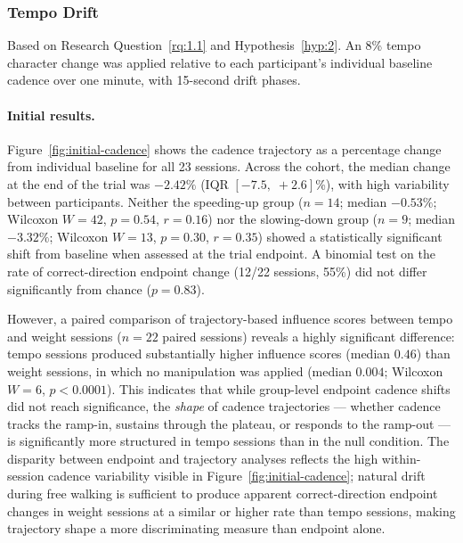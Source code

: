 
\subsubsection{Tempo Drift}
\label{sec:results-tempo}

Based on Research Question~\ref{rq:1.1} and Hypothesis~\ref{hyp:2}.
An 8\% tempo character change was applied relative to each participant's
individual baseline cadence over one minute, with 15-second drift phases.

\paragraph{Initial results.}

Figure~\ref{fig:initial-cadence} shows the cadence trajectory as a percentage
change from individual baseline for all 23 sessions.
Across the cohort, the median change at the end of the trial was $-2.42\%$
(IQR $[-7.5,\; +2.6]$\%), with high variability between participants.
Neither the speeding-up group ($n = 14$; median $-0.53\%$;
Wilcoxon $W = 42$, $p = 0.54$, $r = 0.16$)
nor the slowing-down group ($n = 9$; median $-3.32\%$;
Wilcoxon $W = 13$, $p = 0.30$, $r = 0.35$)
showed a statistically significant shift from baseline when assessed
at the trial endpoint.
A binomial test on the rate of correct-direction endpoint change
(12/22 sessions, 55\%) did not differ significantly from chance
($p = 0.83$).

However, a paired comparison of trajectory-based influence scores
between tempo and weight sessions ($n = 22$ paired sessions) reveals
a highly significant difference: tempo sessions produced substantially
higher influence scores (median $0.46$) than weight sessions,
in which no manipulation was applied (median $0.004$;
Wilcoxon $W = 6$, $p < 0.0001$).
This indicates that while group-level endpoint cadence shifts did not reach
significance, the \emph{shape} of cadence trajectories --- whether cadence
tracks the ramp-in, sustains through the plateau, or responds to the
ramp-out --- is significantly more structured in tempo sessions than in
the null condition.
The disparity between endpoint and trajectory analyses reflects the
high within-session cadence variability visible in
Figure~\ref{fig:initial-cadence}; natural drift during free walking
is sufficient to produce apparent correct-direction endpoint changes
in weight sessions at a similar or higher rate than tempo sessions,
making trajectory shape a more discriminating measure than endpoint
alone.

